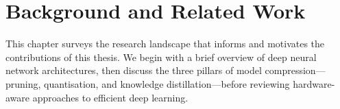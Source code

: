 \chapter{Background and Related Work}

This chapter surveys the research landscape that informs and motivates
the contributions of this thesis. We begin with a brief overview of deep
neural network architectures, then discuss the three pillars of model
compression---pruning, quantisation, and knowledge distillation---before
reviewing hardware-aware approaches to efficient deep learning.
